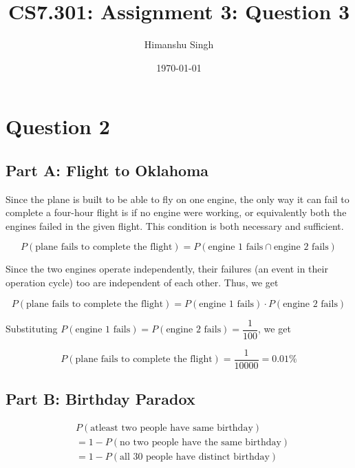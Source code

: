\documentclass[a4paper, 12pt]{article}
\title{CS7.301: Assignment 3: Question 3}
\author{Himanshu Singh}
\date{\today}
\begin{document}
\section*{Question 2}

\subsection*{Part A: Flight to Oklahoma}

Since the plane is built to be able to fly on one engine, the only way it can fail to complete a four-hour flight is if no engine were working, or equivalently both the engines failed in the given flight. This condition is both necessary and sufficient.

\begin{equation}
P(\text{plane fails to complete the flight}) = P(\text{engine 1 fails} \cap \text{engine 2 fails})
\end{equation}

Since the two engines operate independently, their failures (an event in their operation cycle) too are independent of each other. Thus, we get

\begin{equation}
P(\text{plane fails to complete the flight}) = P(\text{engine 1 fails}) \cdot P(\text{engine 2 fails})
\end{equation}

Substituting $P(\text{engine 1 fails}) = P(\text{engine 2 fails}) = \dfrac{1}{100}$, we get

\begin{equation}
P(\text{plane fails to complete the flight}) = \dfrac{1}{10000} = 0.01\%
\end{equation}

\subsection*{Part B: Birthday Paradox}

\begin{fleqn}[\parindent]
\begin{equation}
\begin{split}
& P(\text{atleast two people have same birthday}) \\
&= 1 - P(\text{no two people have the same birthday}) \\
&= 1 - P(\text{all 30 people have distinct birthday}) \\
\end{split}
\end{equation}
\end{fleqn}
\end{document}
